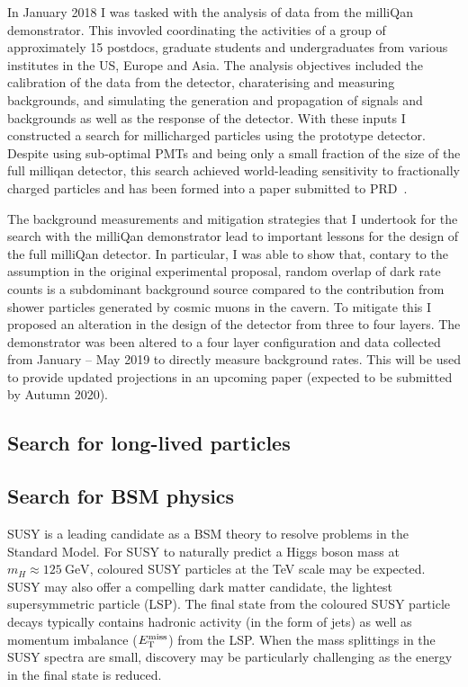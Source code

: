\documentclass[11pt]{article}
\theoremstyle{plain} \numberwithin{equation}{section}
\theoremstyle{definition}
\DeclareRobustCommand{\met}{$\mbox{$E_\text{T}^{\rm miss}$}\xspace$}
\begin{document}
In January 2018 I was tasked with the analysis of data from the 
milliQan demonstrator. This invovled coordinating the activities of a group of approximately
15 postdocs, graduate students and undergraduates from various institutes in the US, Europe and Asia. 
The analysis objectives included the calibration of the data from the detector,
charaterising and measuring backgrounds, and simulating the generation and propagation of 
signals and backgrounds as well as the response of the detector. With these inputs I constructed
a search for millicharged particles using the prototype detector. Despite using sub-optimal PMTs 
and being only a small fraction of the size of the full milliqan detector,
this search achieved world-leading sensitivity to fractionally charged particles and has been formed
into a paper submitted to PRD~\cite{XX}.

The background measurements and mitigation strategies that I undertook for the search
with the milliQan demonstrator lead to important lessons for the design 
of the full milliQan detector. In particular, I was able to show 
that, contary to the assumption in the original experimental proposal, random overlap of dark rate counts
is a subdominant background source compared to the contribution from shower particles generated
by cosmic muons in the cavern. To mitigate this I proposed an alteration in the design of the detector from
three to four layers. The demonstrator was been altered to a four layer configuration and data collected from 
January -- May 2019 to directly measure background rates. This will be used to provide updated
projections in an upcoming paper (expected to be submitted by Autumn 2020).

\subsection*{Search for long-lived particles}

\subsection*{Search for BSM physics}

SUSY is a leading candidate as a BSM theory to resolve problems in the Standard Model.
For SUSY to naturally predict a Higgs boson mass at $m_H \approx 125~\text{GeV}$, coloured 
SUSY particles at the TeV scale may be expected. SUSY may also offer a compelling dark matter
candidate, the lightest supersymmetric particle (LSP). The final state from the coloured SUSY 
particle decays typically contains hadronic activity (in the form of jets) as well as momentum 
imbalance (\met) from the LSP. When the mass splittings in the SUSY spectra are small, 
discovery may be particularly challenging as the energy in the final state is reduced.
\end{document}
